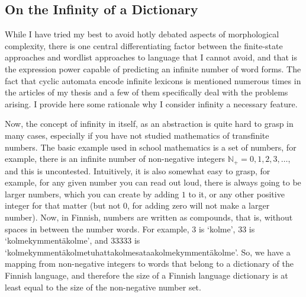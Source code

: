 \documentclass[officiallayout,final]{unihelcompling}
\begin{document}
\subsection{On the Infinity of a Dictionary}
\label{subsec:infinity}

While I have tried my best to avoid hotly debated aspects of \gls{morphological
complexity}, there is one central differentiating factor between the
finite-state approaches and wordlist approaches to language that I cannot
avoid, and that is the expression power capable of predicting an infinite
number of word forms. The fact that cyclic automata encode infinite lexicons is
mentioned numerous times in the articles of my thesis and a few of them
specifically deal with the problems arising. I provide here some rationale why
I consider infinity a necessary feature.

Now, the concept of infinity in itself, as an abstraction is quite hard to
grasp in many cases, especially if you have not studied mathematics of
transfinite numbers. The basic example used in school mathematics is a set of
numbers, for example, there is an infinite number of non-negative integers
$\mathbb{N}_+ = 0, 1, 2, 3, \ldots$, and this is uncontested. Intuitively, it
is also somewhat easy to grasp, for example, for any given number you can read
out loud, there is always going to be larger numbers, which you can create by
adding $1$ to it, or any other positive integer for that matter (but not $0$,
for adding zero will not make a larger number). Now, in Finnish, numbers are
written as compounds, that is, without spaces in between the number words.  For
example, 3 is `kolme', 33 is `kolmekymmentäkolme', and 33333 is
`kolmekymmentäkolmetuhattakolmesataakolmekymmentäkolme'. So, we have a mapping
from non-negative integers to words that belong to a dictionary of the Finnish
language, and therefore the size of a Finnish language dictionary is at least
equal to the size of the non-negative number set.
\end{document}
